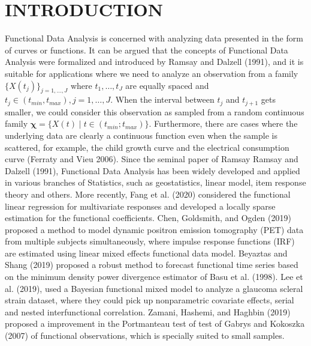 \documentclass[
  12pt,
]{article}
\theoremstyle{definition}
\theoremstyle{definition}
\theoremstyle{definition}
\theoremstyle{remark}
\begin{document}
\hypertarget{introduction}{%
\section{INTRODUCTION}\label{introduction}}

Functional Data Analysis is concerned with analyzing data presented in the form of curves or functions. It can be argued that the concepts of Functional Data Analysis were formalized and introduced
by Ramsay and Dalzell (1991), and it is suitable for applications where we need to analyze an observation from a family \(\{X(t_j)\}_{j=1, \dots, J}\) where \(t_1, \dots, t_J\) are equally spaced and \(t_j \in (t_{min}, t_{max}), j=1, \dots, J\). When the interval between \(t_j\) and \(t_{j+1}\) gets smaller, we could consider this observation as sampled from a random continuous family \(\bm{\chi} = \{X(t) \mid t \in (t_{min}; t_{max}) \}\).
Furthermore, there are cases where the underlying data are clearly a continuous function even when the sample is scattered, for example, the child growth curve and the
electrical consumption curve (Ferraty and Vieu 2006).
Since the seminal paper of Ramsay Ramsay and Dalzell (1991),
Functional Data Analysis has been widely developed and applied in various branches of Statistics, such as geostatistics, linear model, item response theory and others. More recently, Fang et al. (2020) considered the functional linear regression for multivariate responses and developed a locally sparse estimation for the functional coefficients. Chen, Goldsmith, and Ogden (2019) proposed a method to model dynamic positron emission tomography (PET) data from multiple subjects simultaneously, where impulse response functions (IRF) are estimated using linear mixed effects functional data model. Beyaztas and Shang (2019) proposed a robust method to forecast functional time series based on the minimum density power divergence estimator of Basu et al. (1998). Lee et al. (2019), used a Bayesian functional mixed model to analyze a glaucoma scleral strain dataset, where they could pick up nonparametric covariate effects, serial and nested interfunctional correlation. Zamani, Hashemi, and Haghbin (2019) proposed a improvement in the Portmanteau test of test of Gabrys and Kokoszka (2007) of functional observations, which is specially suited to small samples.
\end{document}
